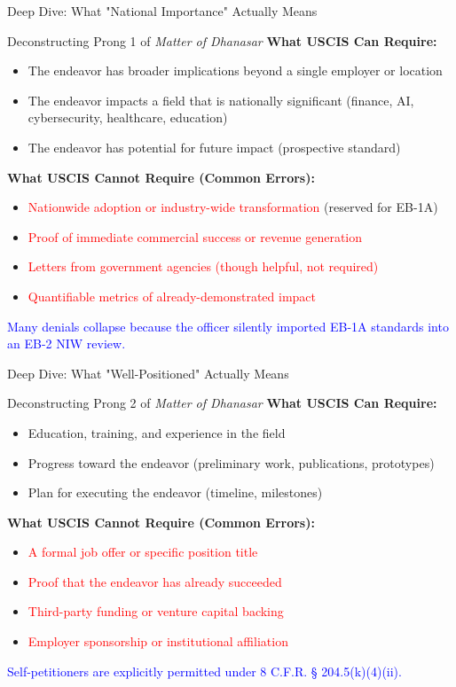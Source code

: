 \documentclass[11pt]{beamer}
\begin{document}
	\begin{frame}{Deep Dive: What "National Importance" Actually Means}
		\scriptsize
		\begin{block}{Deconstructing Prong 1 of \textit{Matter of Dhanasar}}
			\textbf{What USCIS Can Require:}
			\begin{itemize}
				\item The endeavor has broader implications beyond a single employer or location
				\item The endeavor impacts a field that is nationally significant (finance, AI, cybersecurity, healthcare, education)
				\item The endeavor has potential for future impact (prospective standard)
			\end{itemize}
			\textbf{What USCIS Cannot Require (Common Errors):}
			\begin{itemize}
				\item \textcolor{red}{Nationwide adoption or industry-wide transformation} (reserved for EB-1A)
				\item \textcolor{red}{Proof of immediate commercial success or revenue generation}
				\item \textcolor{red}{Letters from government agencies (though helpful, not required)}
				\item \textcolor{red}{Quantifiable metrics of already-demonstrated impact}
			\end{itemize}
			\textcolor{blue}{Many denials collapse because the officer silently imported EB-1A standards into an EB-2 NIW review.}
		\end{block}
	\end{frame}
	
	\begin{frame}{Deep Dive: What "Well-Positioned" Actually Means}
		\scriptsize
		\begin{block}{Deconstructing Prong 2 of \textit{Matter of Dhanasar}}
			\textbf{What USCIS Can Require:}
			\begin{itemize}
				\item Education, training, and experience in the field
				\item Progress toward the endeavor (preliminary work, publications, prototypes)
				\item Plan for executing the endeavor (timeline, milestones)
			\end{itemize}
			\textbf{What USCIS Cannot Require (Common Errors):}
			\begin{itemize}
				\item \textcolor{red}{A formal job offer or specific position title}
				\item \textcolor{red}{Proof that the endeavor has already succeeded}
				\item \textcolor{red}{Third-party funding or venture capital backing}
				\item \textcolor{red}{Employer sponsorship or institutional affiliation}
			\end{itemize}
			\textcolor{blue}{Self-petitioners are explicitly permitted under 8 C.F.R. § 204.5(k)(4)(ii).}
		\end{block}
	\end{frame}
	
\end{document}
